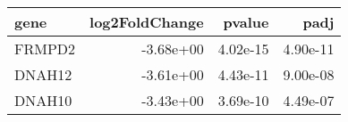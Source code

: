 \begin{tabular}{lrrr}
\toprule
  gene &  log2FoldChange &   pvalue &     padj \\
\midrule
FRMPD2 &       -3.68e+00 & 4.02e-15 & 4.90e-11 \\
DNAH12 &       -3.61e+00 & 4.43e-11 & 9.00e-08 \\
DNAH10 &       -3.43e+00 & 3.69e-10 & 4.49e-07 \\
\bottomrule
\end{tabular}

